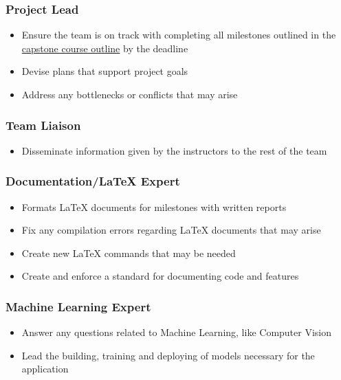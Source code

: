 \documentclass[12pt,letterpaper]{article}
\begin{document}
\subsubsection{Project Lead}
\begin{itemize}
    \item Ensure the team is on track with completing all milestones outlined in
    the
    \href{https://gitlab.cas.mcmaster.ca/courses/capstone/-/blob/main/CourseOutline/Capstone_Outline.pdf}{capstone
    course outline} by the deadline
    \item Devise plans that support project goals
    \item Address any bottlenecks or conflicts that may arise 
\end{itemize}

\subsubsection{Team Liaison}
\begin{itemize}
    \item Disseminate information given by the instructors to the rest of the
    team
\end{itemize}

\subsubsection{Documentation/LaTeX Expert}
\begin{itemize}
    \item Formats LaTeX documents for milestones with written reports
    \item Fix any compilation errors regarding LaTeX documents that may arise
    \item Create new LaTeX commands that may be needed
    \item Create and enforce a standard for documenting code and features
\end{itemize}

\subsubsection{Machine Learning Expert}
\label{mlexpert}
\begin{itemize}
    \item Answer any questions related to Machine Learning, like Computer Vision
    \item Lead the building, training and deploying of models necessary for the
    application
\end{itemize}
\end{document}

